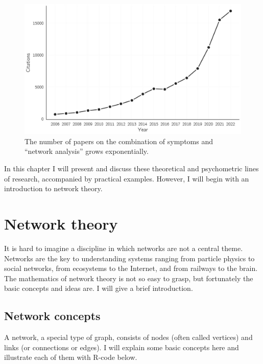 \documentclass[
  a4paper,
  DIV=11,
  numbers=noendperiod,
  oneside]{scrreprt}
\begin{document}
\begin{figure}

{\centering \includegraphics{media/ch6/fig-ch6-img1-old-70.jpg}

}

\caption{\label{fig-ch6-img1-old-70}The number of papers on the
combination of symptoms and ``network analysis'' grows exponentially.}

\end{figure}

In this chapter I will present and discuss these theoretical and
psychometric lines of research, accompanied by practical examples.
However, I will begin with an introduction to network theory.

\hypertarget{sec-Network-theory}{%
\section{Network theory}\label{sec-Network-theory}}

It is hard to imagine a discipline in which networks are not a central
theme. Networks are the key to understanding systems ranging from
particle physics to social networks, from ecosystems to the Internet,
and from railways to the brain. The mathematics of network theory is not
so easy to grasp, but fortunately the basic concepts and ideas are. I
will give a brief introduction.

\hypertarget{sec-Network-concepts}{%
\subsection{Network concepts}\label{sec-Network-concepts}}

A network, a special type of graph, consists of nodes (often called
vertices) and links (or connections or edges). I will explain some basic
concepts here and illustrate each of them with R-code below.
\end{document}
